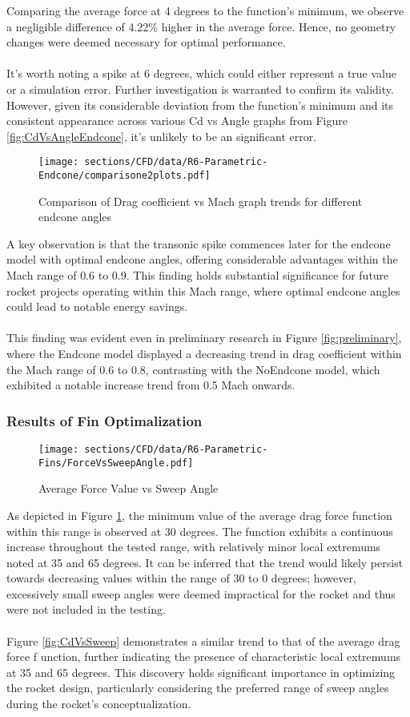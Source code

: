 \noindent Comparing the average force at 4 degrees to the function's minimum, we observe a 
negligible difference of 4.22\% higher in the average force. Hence, no geometry changes were 
deemed necessary for optimal performance.\\\\
It's worth noting a spike at 6 degrees, which could either represent a true value or a 
simulation error. Further investigation is warranted to confirm its validity. However, given 
its considerable deviation from the function's minimum and its consistent appearance across 
various Cd vs Angle graphs from Figure \ref{fig:CdVsAngleEndcone}, it's unlikely to 
be an significant error.

\begin{figure}[H]
    \centering
    \texttt{[image: sections/CFD/data/R6-Parametric-Endcone/comparisone2plots.pdf]}
    \caption{Comparison of Drag coefficient vs Mach graph trends for different endcone angles}
\end{figure}
\noindent A key observation is that the transonic spike commences later for the endcone 
model with optimal endcone angles, offering considerable advantages within the Mach range 
of 0.6 to 0.9. This finding holds substantial significance for future rocket projects operating 
within this Mach range, where optimal endcone angles could lead to notable energy savings.\\\\
This finding was evident even in preliminary research in Figure \ref{fig:preliminary}, where the Endcone model displayed a 
decreasing trend in drag coefficient within the Mach range of 0.6 to 0.8, contrasting with the 
NoEndcone model, which exhibited a notable increase trend from 0.5 Mach onwards.

\subsubsection{Results of Fin Optimalization}
\begin{figure}[H]
    \centering
    \texttt{[image: sections/CFD/data/R6-Parametric-Fins/ForceVsSweepAngle.pdf]}
    \caption{Average Force Value vs Sweep Angle}
    \label{fig:ForceVsSweepAngle}
\end{figure}
As depicted in Figure \ref{fig:ForceVsSweepAngle}, the minimum value of the average drag force 
function within this range is observed at 30 degrees. The function exhibits a continuous increase 
throughout the tested range, with relatively minor local extremums noted at 35 and 65 degrees. It 
can be inferred that the trend would likely persist towards decreasing values within the range of 
30 to 0 degrees; however, excessively small sweep angles were deemed impractical for the rocket 
and thus were not included in the testing.\\\\
Figure \ref{fig:CdVsSweep} demonstrates a similar trend to that of the average drag force f
unction, further indicating the presence of characteristic local extremums at 35 and 65 degrees. 
This discovery holds significant importance in optimizing the rocket design, particularly 
considering the preferred range of sweep angles during the rocket's conceptualization.


